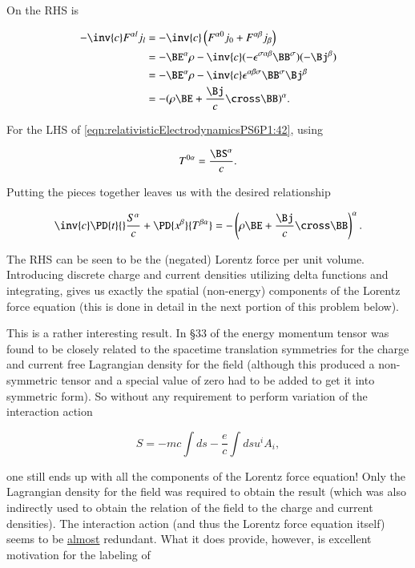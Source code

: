 On the RHS is 

\begin{align*}
-\inv{c} F^{\alpha l} j_l
&=
-\inv{c} 
\left( 
F^{\alpha 0} j_0 
+F^{\alpha \beta} j_\beta 
\right) \\
&= 
- \BE^\alpha \rho - \inv{c} (- \epsilon^{\sigma \alpha \beta} \BB^\sigma) (-\Bj^\beta) \\
&= 
- \BE^\alpha \rho - \inv{c} \epsilon^{\alpha \beta \sigma} \BB^\sigma \Bj^\beta \\
&= 
- (\rho \BE + \frac{\Bj}{c} \cross \BB)^\alpha.
\end{align*}

For the LHS of \ref{eqn:relativisticElectrodynamicsPS6P1:42}, using

\begin{equation}\label{eqn:relativisticElectrodynamicsPS6P1:200}
T^{0 \alpha} = \frac{\BS^\alpha}{c}.
\end{equation}

Putting the pieces together leaves us with the desired relationship

\begin{equation}\label{eqn:relativisticElectrodynamicsPS6P1:201}
\inv{c} \PD{t}{} \frac{S^\alpha}{c} + \PD{x^\beta}{T^{\beta \alpha}} = 
- \left( \rho \BE + \frac{\Bj}{c} \cross \BB \right)^\alpha.
\end{equation}

The RHS can be seen to be the (negated) Lorentz force per unit volume.  Introducing discrete charge and current densities utilizing delta functions and integrating, gives us exactly the spatial (non-energy) components of the Lorentz force equation (this is done in detail in the next portion of this problem below).

This is a rather interesting result.  In \S 33 of \citep{landau1980classical} the energy momentum tensor was found to be closely related to the spacetime translation symmetries for the charge and current free Lagrangian density for the field (although this produced a non-symmetric tensor and a special value of zero had to be added to get it into symmetric form).  So without any requirement to perform variation of the interaction action

\begin{equation}\label{eqn:relativisticElectrodynamicsPS6P1:202}
S = -m c \int ds - \frac{e}{c} \int ds u^i A_i,
\end{equation}

one still ends up with all the components of the Lorentz force equation!  Only the Lagrangian density for the field was required to obtain the result (which was also indirectly used to obtain the relation of the field to the charge and current densities).  The interaction action (and thus the Lorentz force equation itself) seems to be \underline{almost} redundant.  What it does provide, however, is excellent motivation for the labeling of

